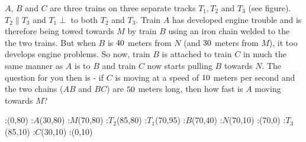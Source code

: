 


\question[4] $A$, $B$ and $C$ are three trains on three separate tracks $T_1, T_2$ and $T_3$ (see figure). 
$T_2\parallel T_3$ and $T_1\perp$ to both $T_2$ and $T_3$. Train $A$ has developed engine 
trouble and is therefore being towed towards $M$ by train $B$ using an iron chain welded to the 
the two trains. But when $B$ is $40$ meters from $N$ (and $30$ meters from $M$), it too
develops engine problems. So now, train $B$ is attached to train $C$ in much the same manner 
as $A$ is to $B$ and train $C$ now starts pulling $B$ towards $N$. The question for you then is
- if $C$ is moving at a speed of $10$ meters per second and the two chains ($AB$ and $BC$)
are $50$ meters long, then how fast is $A$ moving towards $M$?

\watchout[-5cm]

  :(0,80) %
  :$A$(30,80)
  :$M$(70,80)
  :$T_2$(85,80)
  :$T_1$(70,95) %
  :$B$(70,40)
  :$N$(70,10)
  :(70,0)
  :$T_3$(85,10) %
  :$C$(30,10)
  :(0,10)
\figdrawbegin{}
  \figdrawline [100,101,102,103]
  \figdrawline [104,105,106,107]
  \figdrawline [108,109,110]
  \figdrawline [101,105,109]
\figdrawend
{}

\ifprintanswers
  \begin{marginfigure}
    \centerline{\box\figBoxA}
  \end{marginfigure}
\else
  \vspace{1cm}
  \centerline{\box\figBoxA}
  \vspace{1cm}
\fi


